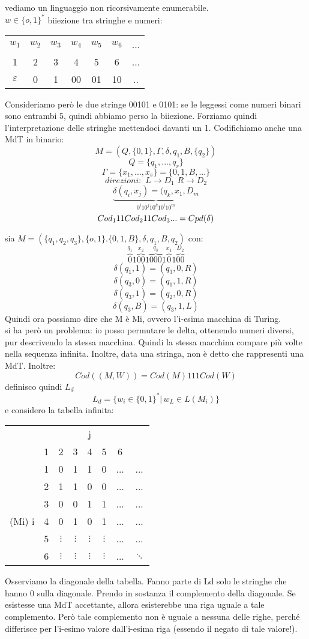 \documentclass[a4paper,12pt, oneside]{book}
\begin{document}
\begin{esempio}
vediamo un linguaggio non ricorsivamente enumerabile.\\
$w\in\{o,1\}^*$ biiezione tra stringhe e numeri:
\begin{center}
\begin{tabular}{c c c c c c c}
$w_1$ & $w_2$ & $w_3$& $w_4$ & $w_5$& $w_6$ & ...\\
1 & 2 & 3 & 4 & 5 & 6 & ...\\
$\varepsilon$ & 0 & 1 & 00 & 01 & 10 & .. 
\end{tabular}
\end{center}
Consideriamo però le due stringe 00101 e 0101: se le leggessi come numeri binari sono entrambi
5, quindi abbiamo perso la biiezione.
Forziamo quindi l'interpretazione delle stringhe mettendoci davanti un 1.
Codifichiamo anche una MdT in binario:
$$M=(Q,\{0,1\},\Gamma,\delta,q_1,B,\{q_2\})$$
$$Q=\{q_1,...,q_r\}$$
$$\Gamma=\{x_1,...,x_s\}=\{0,1,B,...\}$$
$$direzioni:\,\,L\to D_1\,\,R\to D_2$$
$$\underbrace{\delta(q_i,x_j)=(q_k,x_1,D_m}_{0^i10^j10^k10^l10^m}$$
$$Cod_111Cod_211Cod_3\\...=Cpd(\delta)$$
\end{esempio}
\begin{esempio}
sia $M=(\{q_1,q_2,q_3\},\{o,1\}.\{0,1,B\},\delta,q_1,B,q_2)$ con:
$$\overbrace{0}^{q_1}1\overbrace{00}^{x_2}1\overbrace{000}^{q_3}1\overbrace{0}^{x_1}1\overbrace{00}^{D_2}$$
$$\delta(q_1,1)=(q_3,0,R)$$
$$\delta(q_3,0)=(q_1,1,R)$$
$$\delta(q_3,1)=(q_2,0,R)$$
$$\delta(q_3,B)=(q_3,1,L)$$
Quindi ora possiamo dire che M è Mi, ovvero l'i-esima macchina di Turing.
\\
si ha però un problema: io posso permutare le delta, ottenendo numeri diversi, pur descrivendo la stessa
macchina. Quindi la stessa macchina compare più volte nella sequenza infinita. Inoltre, data una
stringa, non è detto che rappresenti una MdT. Inoltre:
$$Cod((M,W))=Cod(M)111Cod(W)$$
definisco quindi $L_d$
$$L_d=\{w_i\in\{0,1\}^*|\,w_L\in L(M_i)\}$$
e considero la tabella infinita:
\begin{center}
\begin{tabular}{c c|c c c c c c}
 &   &   &  &  j &   &   \\ 
 & 1 & 2 & 3 & 4 & 5 & 6 \\
 \hline
&1 & 0 & 1 & 1 & 0 & ... & ...\\
&2 & 1 & 1 & 0 & 0 & ... & ...\\
&3 & 0 & 0 & 1 & 1 & ... & ...\\
(Mi) i&4 & 0 & 1 & 0 & 1 & ... & ...\\
&5 & $\vdots$ & $\vdots$ & $\vdots$ & $\vdots$ & ... & ...\\
&6 & $\vdots$ & $\vdots$ & $\vdots$ & $\vdots$ & ... & $\ddots$
\end{tabular}
\end{center}
Osserviamo la diagonale della tabella. Fanno parte di Ld solo le stringhe che hanno 0 sulla
diagonale. Prendo in sostanza il complemento della diagonale.
Se esistesse una MdT accettante, allora esisterebbe una riga uguale a tale complemento.
Però tale complemento non è uguale a nessuna delle righe, perché differisce per l'i-esimo valore
dall'i-esima riga (essendo il negato di tale valore!).
\end{esempio}
\end{document}
